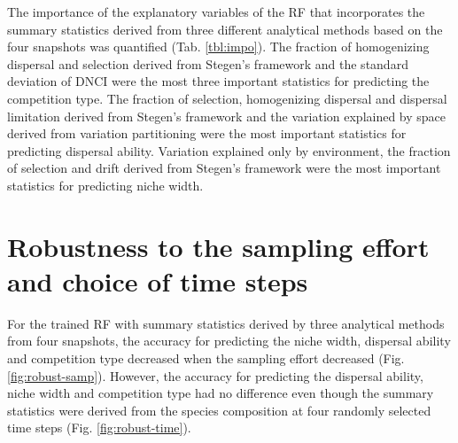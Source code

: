 	The importance of the explanatory variables of the RF that incorporates the summary statistics derived from three different analytical methods based on the four snapshots was quantified (Tab. \ref{tbl:impo}). The fraction of homogenizing dispersal and selection derived from Stegen's framework and the standard deviation of DNCI were the most three important statistics for predicting the competition type. The fraction of selection, homogenizing dispersal and dispersal limitation derived from Stegen's framework and the variation explained by space derived from variation partitioning were the most important statistics for predicting dispersal ability. Variation explained only by environment, the fraction of selection and drift derived from Stegen's framework were the most important statistics for predicting niche width.
	
	
	\section{Robustness to the sampling effort and choice of time steps}
	\noindent
	For the trained RF with summary statistics derived by three analytical methods from four snapshots, the accuracy for predicting the niche width, dispersal ability and competition type decreased when the sampling effort decreased (Fig. \ref{fig:robust-samp}). However, the accuracy for predicting the dispersal ability, niche width and competition type had no difference even though the summary statistics were derived from the species composition at four randomly selected time steps (Fig. \ref{fig:robust-time}). 
	
